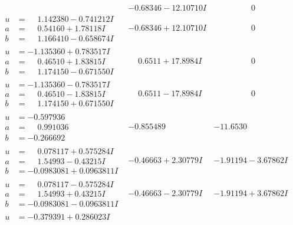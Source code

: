 \documentclass[1p]{elsarticle_modified}
\theoremstyle{definition}
\begin{document}
$$\begin{array}{c|c|c}
 & -0.68346 - 12.10710 I & \phantom{-0.000000 } 0 \\ \hline\begin{aligned}
u &= \phantom{-}1.142380 - 0.741212 I \\
a &= \phantom{-}0.54160 + 1.78118 I \\
b &= \phantom{-}1.166410 - 0.658674 I\end{aligned}
 & -0.68346 + 12.10710 I & \phantom{-0.000000 } 0 \\ \hline\begin{aligned}
u &= -1.135360 + 0.783517 I \\
a &= \phantom{-}0.46510 + 1.83815 I \\
b &= \phantom{-}1.174150 - 0.671550 I\end{aligned}
 & \phantom{-}0.6511 + 17.8984 I & \phantom{-0.000000 } 0 \\ \hline\begin{aligned}
u &= -1.135360 - 0.783517 I \\
a &= \phantom{-}0.46510 - 1.83815 I \\
b &= \phantom{-}1.174150 + 0.671550 I\end{aligned}
 & \phantom{-}0.6511 - 17.8984 I & \phantom{-0.000000 } 0 \\ \hline\begin{aligned}
u &= -0.597936\phantom{ +0.000000I} \\
a &= \phantom{-}0.991036\phantom{ +0.000000I} \\
b &= -0.266692\phantom{ +0.000000I}\end{aligned}
 & -0.855489\phantom{ +0.000000I} & -11.6530\phantom{ +0.000000I} \\ \hline\begin{aligned}
u &= \phantom{-}0.078117 + 0.575284 I \\
a &= \phantom{-}1.54993 - 0.43215 I \\
b &= -0.0983081 + 0.0963811 I\end{aligned}
 & -0.46663 + 2.30779 I & -1.91194 - 3.67862 I \\ \hline\begin{aligned}
u &= \phantom{-}0.078117 - 0.575284 I \\
a &= \phantom{-}1.54993 + 0.43215 I \\
b &= -0.0983081 - 0.0963811 I\end{aligned}
 & -0.46663 - 2.30779 I & -1.91194 + 3.67862 I \\ \hline\begin{aligned}
u &= -0.379391 + 0.286023 I \\

\end{aligned}
\end{array}$$
\end{document}
